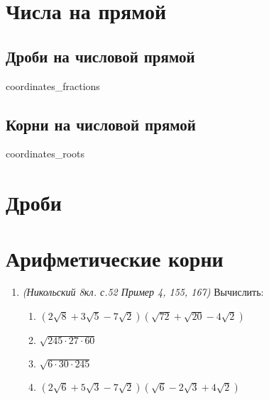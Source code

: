 \documentclass[12pt, a4paper]{article}
\begin{document}
 
\section{Числа на прямой}
	\subsection{Дроби на числовой прямой}
	{coordinates_fractions}
	\subsection{Корни на числовой прямой}
	{coordinates_roots}
\section{Дроби}
\section{Арифметические корни}
\begin{enumerate}
	\item \textit{(Никольский 8кл. с.52 Пример 4, 155, 167)} Вычислить:
	\begin{enumerate}[label=\asbuk*)]
		\item $(2\sqrt{8}+3\sqrt{5}-7\sqrt{2})(\sqrt{72}+\sqrt{20}-4\sqrt{2})$
		\item  $\sqrt{245 \cdot 27 \cdot 60}$
		\item $\sqrt{6 \cdot 30 \cdot 245}$
		\item $(2\sqrt{6}+5\sqrt{3}-7\sqrt{2})(\sqrt{6}-2\sqrt{3}+4\sqrt{2})$

	\end{enumerate}
\end{enumerate}
\end{document}
